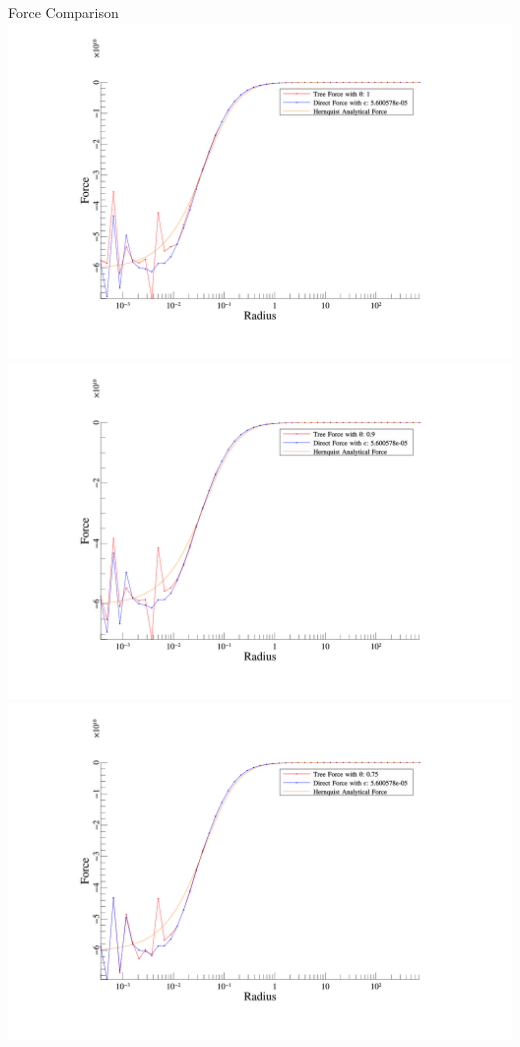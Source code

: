 \begin{frame}[allowframebreaks]{Force Comparison}
	\includegraphics[width=\textwidth]{figures/plots/tree_force_1.png}
	\includegraphics[width=\textwidth]{figures/plots/tree_force_0.9.png}
	\includegraphics[width=\textwidth]{figures/plots/tree_force_0.75.png}

\end{frame}
